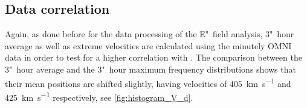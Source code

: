 \subsection{Data correlation}
Again, as done before for the data processing of the E"~field analysis, 3"~hour average as well as extreme velocities are calculated using the minutely OMNI data in order to test for a higher correlation with \Kp{}. The comparison between the 3"~hour average and the 3"~hour maximum frequency distributions shows that their mean positions are shifted slightly, having velocities of \SI{405}{\km\per\s} and \SI{425}{\km\per\s} respectively, see \autoref{fig:histogram_V_d}.
\begin{figure}[htb]
	\begin{floatrow}
\end{floatrow}
\end{figure}
